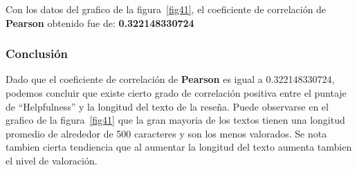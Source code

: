 Con los datos del grafico de la figura~\ref{fig41}, el coeficiente de correlación de \textbf{Pearson} obtenido fue de: \textbf{0.322148330724}

\subsubsection{Conclusión}

Dado que el coeficiente de correlación de \textbf{Pearson} es igual a 0.322148330724, podemos concluir que existe cierto grado de correlación positiva entre el puntaje de ``Helpfulness'' y la longitud del texto de la reseña.
Puede observarse en el grafico de la figura~\ref{fig41} que la gran mayoria de los textos tienen una longitud promedio de alrededor de 500 caracteres y son los menos valorados. Se nota tambien cierta tendiencia que al aumentar la longitud del texto aumenta tambien el nivel de valoración.
